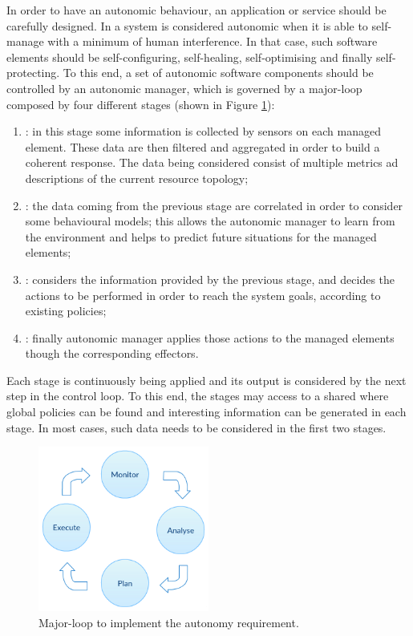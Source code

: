 In order to have an autonomic behaviour, an application or service should be carefully designed. In 
\cite{ibm2005architectural} a system is considered autonomic when it is able to self-manage with a
minimum of human interference. In that case, such software elements should be self-configuring,
self-healing, self-optimising and finally self-protecting. To this end, a set of autonomic software
components should be controlled by an autonomic manager, which is governed by a major-loop
composed by four different stages (shown in Figure \ref{img:elasticity-requirements-autonomy}):

\begin{enumerate}
	\item{: in this stage some information is collected by sensors on each managed
		element. These data are then filtered and aggregated in order to build a coherent response. The
		data being considered consist of multiple metrics ad descriptions of the current resource
		topology;}
	\item{: the data coming from the previous stage are correlated in order to consider
		some behavioural models; this allows the autonomic manager to learn from the environment and helps
		to predict future situations for the managed elements;}
	\item{: considers the information provided by the previous stage, and decides the
		actions to be performed in order to reach the system goals, according to existing policies;}
	\item{: finally autonomic manager applies those actions to the managed elements
		though the corresponding effectors.}
\end{enumerate}

Each stage is continuously being applied and its output is considered by the next step in the control
loop. To this end, the stages may access to a shared  where global policies
can be found and interesting information can be generated in each stage. In most cases, such data
needs to be considered in the first two stages.

\begin{figure}
	\centering{}
	\includegraphics[width=0.5\textwidth]{chapters/elasticity/images/autonomy.png}
	\caption[Major-loop for autonomy]{Major-loop to implement the autonomy requirement.}
	\label{img:elasticity-requirements-autonomy}
\end{figure}

